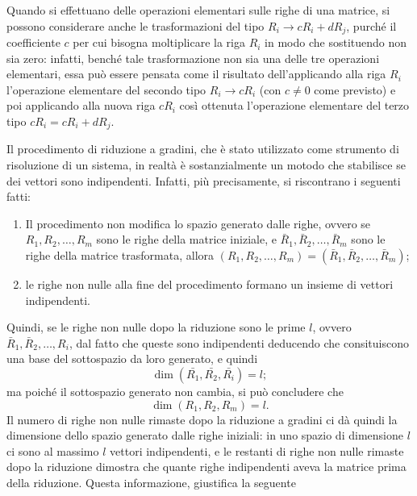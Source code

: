 \begin{oss}
  \label{oss:guess-jorda1}
  Quando si effettuano delle operazioni elementari sulle righe di una
  matrice, si possono considerare anche le trasformazioni del tipo $R_i\to
  cR_i+dR_{j}$, purché il coefficiente $c$ per cui bisogna moltiplicare
  la riga $R_i$ in modo che sostituendo non sia zero: infatti, benché
  tale trasformazione non sia una delle tre operazioni elementari, essa
  può essere pensata come il risultato dell'applicando alla riga $R_i$
  l'operazione elementare del secondo tipo $R_i\to cR_i$ (con $c\neq 0$
  come previsto) e poi applicando alla nuova riga $cR_i$ così ottenuta
  l'operazione elementare del terzo tipo $cR_i=cR_i+dR_j$.
\end{oss}
Il procedimento di riduzione a gradini, che è stato utilizzato come
strumento di risoluzione di un sistema, in realtà è sostanzialmente un
motodo che stabilisce se dei vettori sono indipendenti. Infatti, più
precisamente, si riscontrano i seguenti fatti:
\begin{enumerate}
\item Il procedimento non modifica lo spazio generato dalle righe, ovvero
  se $R_1,R_2,\dots,R_m$ sono le righe della matrice iniziale, e
  $\bar{R}_1,\bar{R}_2,\dots,\bar{R}_m$ sono le righe della matrice
  trasformata, allora $(R_1,R_2,\dots,R_m)=(\bar{R}_1,\bar{R}_2,\dots,
  \bar{R}_m)$;
\item le righe non nulle alla fine del procedimento formano un insieme di
  vettori indipendenti.
\end{enumerate}
Quindi, se le righe non nulle dopo la riduzione sono le prime $l$, ovvero
$\bar{R}_1,\bar{R}_2,\dots,R_i$, dal fatto che queste sono indipendenti
deducendo che consituiscono una base del sottospazio da loro generato, e
quindi
\begin{equation*}
  \dim(\bar{R_1},\bar{R_2},\bar{R_i})=l;
\end{equation*}
ma poiché il sottospazio generato non cambia, si può concludere che
\begin{equation*}
  \dim(R_1,R_2,R_m)=l.
\end{equation*}
Il numero di righe non nulle rimaste dopo la riduzione a gradini ci dà
quindi la dimensione dello spazio generato dalle righe iniziali: in uno
spazio di dimensione $l$ ci sono al massimo $l$ vettori indipendenti, e
le restanti di righe non nulle rimaste dopo la riduzione dimostra che
quante righe indipendenti  aveva la matrice prima della riduzione. Questa
informazione, giustifica la seguente
